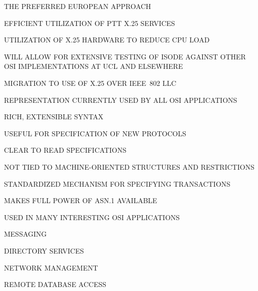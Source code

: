 \begin{bwslide}

\begin{nrtc}
\item	THE PREFERRED EUROPEAN APPROACH

\item	EFFICIENT UTILIZATION OF PTT X.25 SERVICES

\item	UTILIZATION OF X.25 HARDWARE TO REDUCE CPU LOAD

\item	WILL ALLOW FOR EXTENSIVE TESTING OF ISODE AGAINST OTHER OSI
	IMPLEMENTATIONS AT UCL AND ELSEWHERE

\item	MIGRATION TO USE OF X.25 OVER IEEE~802 LLC
\end{nrtc}
\end{bwslide}


\begin{bwslide}

\begin{nrtc}
\item	REPRESENTATION CURRENTLY USED BY ALL OSI APPLICATIONS

\item	RICH, EXTENSIBLE SYNTAX

\item	USEFUL FOR SPECIFICATION OF NEW PROTOCOLS
    \begin{nrtc}
    \item	CLEAR TO READ SPECIFICATIONS

    \item	NOT TIED TO MACHINE-ORIENTED STRUCTURES AND RESTRICTIONS
    \end{nrtc}
\end{nrtc}
\end{bwslide}


\begin{bwslide}

\begin{nrtc}
\item	STANDARDIZED MECHANISM FOR SPECIFYING TRANSACTIONS

\item	MAKES FULL POWER OF ASN.1 AVAILABLE

\item	USED IN MANY INTERESTING OSI APPLICATIONS
    \begin{nrtc}
    \item	MESSAGING

    \item	DIRECTORY SERVICES

    \item	NETWORK MANAGEMENT

    \item	REMOTE DATABASE ACCESS
    \end{nrtc}
\end{nrtc}
\end{bwslide}


